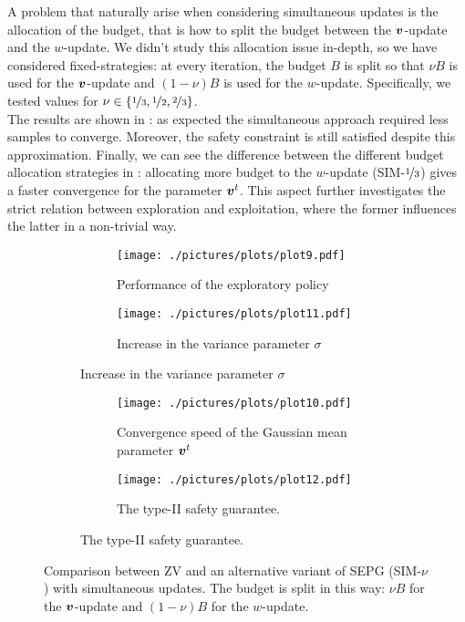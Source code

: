 A problem that naturally arise when considering simultaneous updates is the allocation of the budget, that is how to split the budget between the $\boldsymbol{v}$-update and the $w$-update. We didn't study this allocation issue in-depth, so we have considered fixed-strategies: at every iteration, the budget $B$ is split so that $\nu B$ is used for the $\boldsymbol{v}$-update and $(1-\nu)B$ is used for the $w$-update. Specifically, we tested values for $\nu \in \{\nicefrac{1}{3}, \nicefrac{1}{2}, \nicefrac{2}{3}\}$.\\
The results are shown in : as expected the simultaneous approach required less samples to converge. Moreover, the safety constraint is still satisfied despite this approximation. Finally, we can see the difference between the different budget allocation strategies in : allocating more budget to the $w$-update (SIM-$\nicefrac{1}{3}$) gives a faster convergence for the parameter $\boldsymbol{v}^t$. This aspect further investigates the strict relation between exploration and exploitation, where the former influences the latter in a non-trivial way.



\begin{figure}[t]
\centering
\begin{subfigure}[t]{\textwidth}
\begin{subfigure}[t]{0.5\textwidth}
\texttt{[image: ./pictures/plots/plot9.pdf]}
\caption{Performance of the exploratory policy} \label{fig:plot3-1}
\end{subfigure}
\hfill
\begin{subfigure}[t]{0.5\textwidth}
\texttt{[image: ./pictures/plots/plot11.pdf]}
\caption{Increase in the variance parameter $\sigma$} \label{fig:plot3-2}
\end{subfigure}
\end{subfigure}

\begin{subfigure}[t]{\textwidth}
\begin{subfigure}[t]{0.5\textwidth}
\texttt{[image: ./pictures/plots/plot10.pdf]}
\caption{Convergence speed of the Gaussian mean parameter $\boldsymbol{v}^t$} \label{fig:plot3-3}
\end{subfigure}
\hfill
\begin{subfigure}[t]{0.5\textwidth}
\texttt{[image: ./pictures/plots/plot12.pdf]}
\caption{The type-II safety guarantee. } \label{fig:plot3-4}
\end{subfigure}
\end{subfigure}

\caption{Comparison between ZV and an alternative variant of SEPG (SIM-$\nu$) with simultaneous updates. The budget is split in this way: $\nu B$ for the $\boldsymbol{v}$-update and $(1-\nu)B$ for the $w$-update. }
\label{fig:plot3}
\end{figure}



